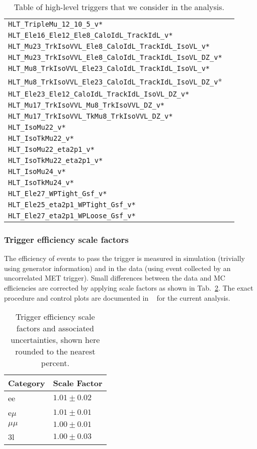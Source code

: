 \begin{table}
\begin{tabular}{ll}
\verb|HLT_TripleMu_12_10_5_v*|\\
\verb|HLT_Ele16_Ele12_Ele8_CaloIdL_TrackIdL_v*|\\
\verb|HLT_Mu23_TrkIsoVVL_Ele8_CaloIdL_TrackIdL_IsoVL_v*|\\
\verb|HLT_Mu23_TrkIsoVVL_Ele8_CaloIdL_TrackIdL_IsoVL_DZ_v*| \\
\verb|HLT_Mu8_TrkIsoVVL_Ele23_CaloIdL_TrackIdL_IsoVL_v*|\\
\verb|HLT_Mu8_TrkIsoVVL_Ele23_CaloIdL_TrackIdL_IsoVL_DZ_v|* \\
\verb|HLT_Ele23_Ele12_CaloIdL_TrackIdL_IsoVL_DZ_v*|\\
\verb|HLT_Mu17_TrkIsoVVL_Mu8_TrkIsoVVL_DZ_v*|\\
\verb|HLT_Mu17_TrkIsoVVL_TkMu8_TrkIsoVVL_DZ_v*|\\
\verb|HLT_IsoMu22_v*|\\
\verb|HLT_IsoTkMu22_v*|\\
\verb|HLT_IsoMu22_eta2p1_v*|\\
\verb|HLT_IsoTkMu22_eta2p1_v*|\\
\verb|HLT_IsoMu24_v*|\\
\verb|HLT_IsoTkMu24_v*|\\
\verb|HLT_Ele27_WPTight_Gsf_v*|\\
\verb|HLT_Ele25_eta2p1_WPTight_Gsf_v*|\\
\verb|HLT_Ele27_eta2p1_WPLoose_Gsf_v*|\\
\hline
\end{tabular}
\caption{Table of high-level triggers that we consider in the analysis.} \label{tab:triggers}
\end{table}

\subsubsection{Trigger efficiency scale factors}
The efficiency of events to pass the trigger is measured in simulation (trivially using generator information) and in the data (using event collected by an uncorrelated MET trigger). Small differences between the data and MC efficiencies are corrected by applying scale factors as shown in Tab.~\ref{tab:trigSFs}. The exact procedure and control plots are documented in ~\cite{CMS_AN_2017-029} for the current analysis.

\begin{table}
\centering
\begin{tabular}{ll}
Category & Scale Factor \\\hline
    ee   & $1.01 \pm 0.02$ \\
e$\mu$   & $1.01 \pm 0.01$ \\
$\mu\mu$ & $1.00 \pm 0.01$ \\
3l       & $1.00 \pm 0.03$ \\\hline
\end{tabular}
\caption[Trigger efficiency scale factors and associated uncertainties.]{Trigger efficiency scale factors and associated uncertainties, shown here rounded to the nearest percent.}
\label{tab:trigSFs}
\end{table}



